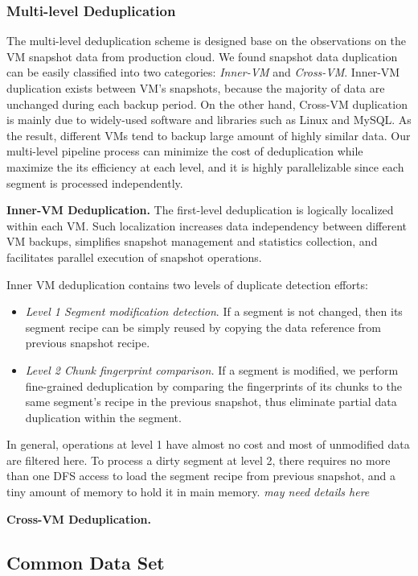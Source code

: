 \subsubsection{Multi-level Deduplication}
The multi-level deduplication scheme is designed base on the observations on the VM snapshot data from production cloud.
We found snapshot data duplication can be easily classified into two categories: \textit{Inner-VM} and \textit{Cross-VM}. 
Inner-VM duplication exists between VM's snapshots, because the majority of data are unchanged during each backup period. 
On the other hand, Cross-VM duplication is mainly due to widely-used software and libraries such as Linux and MySQL. 
As the result, different VMs tend to backup large amount of highly similar data.
Our multi-level pipeline process can minimize the cost of deduplication while maximize the its efficiency at each level,
and it is highly parallelizable since each segment is processed independently.

\textbf{Inner-VM Deduplication.}
The first-level deduplication is logically localized within each VM.
Such localization increases data independency between different VM backups,
simplifies snapshot management and statistics collection,
and facilitates parallel execution of snapshot operations.

Inner VM deduplication contains two levels of duplicate detection efforts:
\begin{itemize}
\item \textit{Level 1 Segment modification detection}.
If a segment is not changed, then its segment recipe can be simply reused by copying the data
reference from previous snapshot recipe. 
\item \textit{Level 2  Chunk fingerprint comparison.}
If a segment is modified, we perform fine-grained deduplication 
by comparing the fingerprints of its chunks to the same segment's recipe in the previous snapshot,
thus eliminate partial data duplication within the segment.
\end{itemize}

In general, operations at level 1 have almost no cost and most of unmodified data are filtered here. 
To process a dirty segment at level 2, 
there requires no more than one DFS access to load the segment recipe from previous snapshot,
and a tiny amount of memory to hold it in main memory.
\textit{may need details here}

\textbf{Cross-VM Deduplication.}

\subsection{Common Data Set}
